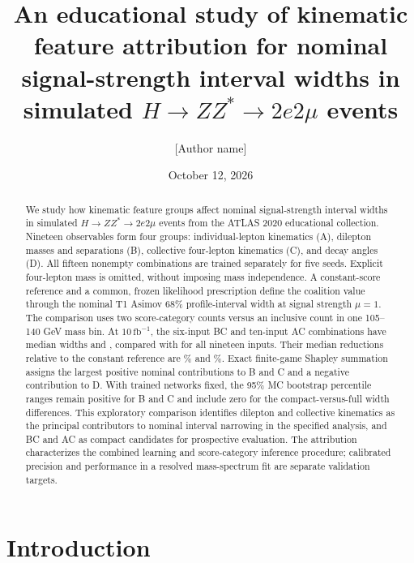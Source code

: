 \documentclass[aps,prd,reprint,superscriptaddress,nofootinbib,longbibliography,floatfix]{revtex4-2}
\let\label\OriginalLaTeXLabel
\begin{document}
\title{An educational study of kinematic feature attribution for nominal
signal-strength interval widths in simulated
\texorpdfstring{$H\to ZZ^*\to2e2\mu$}{H to ZZ* to 2e2mu} events}
\author{[Author name]}
\date{October 12, 2026}

\begin{abstract}
We study how kinematic feature groups affect nominal signal-strength
interval widths in simulated $H\to ZZ^*\to2e2\mu$ events from the ATLAS
2020 educational collection. Nineteen observables form four groups:
individual-lepton kinematics (A), dilepton masses and separations (B),
collective four-lepton kinematics (C), and decay angles (D). All fifteen
nonempty combinations are trained separately for five seeds. Explicit
four-lepton mass is omitted, without imposing mass independence.
A constant-score reference and a common, frozen likelihood prescription
define the coalition value through the nominal T1 Asimov 68\% profile-interval
width at signal strength $\mu=1$. The comparison uses two score-category
counts versus an inclusive count in one 105--140 GeV mass bin.
At $10\,\mathrm{fb}^{-1}$,
the six-input BC and ten-input AC combinations have median widths
\WidthBC{} and \WidthAC{}, compared with \WidthABCD{} for all nineteen inputs.
Their median reductions relative to the constant reference are \GainBC\%
and \GainAC\%. Exact finite-game Shapley summation assigns the largest
positive nominal contributions to B and C and a negative contribution to D.
With trained networks fixed, the 95\% MC bootstrap percentile ranges remain
positive for B and C and include zero for the compact-versus-full width
differences. This exploratory comparison identifies dilepton and collective
kinematics as the principal contributors to nominal interval narrowing in
the specified analysis, and BC and AC as compact candidates for prospective
evaluation. The attribution characterizes the combined learning and
score-category inference procedure; calibrated precision and performance
in a resolved mass-spectrum fit are separate validation targets.
\end{abstract}
\maketitle

\section{Introduction}
\label{sec:introduction}
\end{document}
